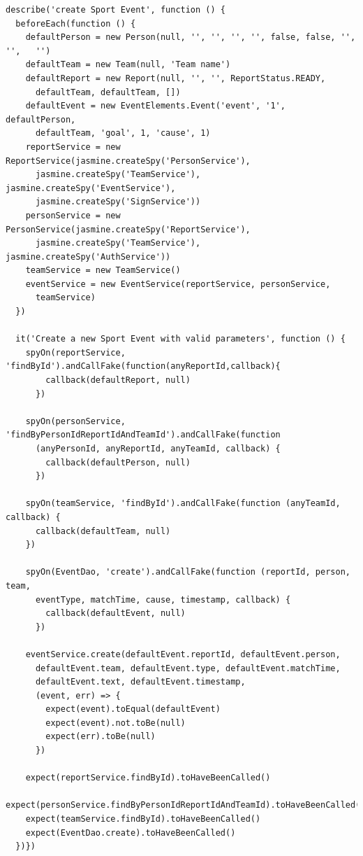     \lstset{}
    \begin{lstlisting}[caption=Exemplo de test no módulo de eventos 
utilizando Jest., label=fig:design:test6]
describe('create Sport Event', function () {
  beforeEach(function () {
    defaultPerson = new Person(null, '', '', '', '', false, false, '', '',   '')
    defaultTeam = new Team(null, 'Team name')
    defaultReport = new Report(null, '', '', ReportStatus.READY, 
      defaultTeam, defaultTeam, [])
    defaultEvent = new EventElements.Event('event', '1', defaultPerson, 
      defaultTeam, 'goal', 1, 'cause', 1)
    reportService = new ReportService(jasmine.createSpy('PersonService'), 
      jasmine.createSpy('TeamService'), jasmine.createSpy('EventService'), 
      jasmine.createSpy('SignService'))
    personService = new PersonService(jasmine.createSpy('ReportService'), 
      jasmine.createSpy('TeamService'), jasmine.createSpy('AuthService'))
    teamService = new TeamService()
    eventService = new EventService(reportService, personService, 
      teamService)
  })

  it('Create a new Sport Event with valid parameters', function () {
    spyOn(reportService, 'findById').andCallFake(function(anyReportId,callback){
        callback(defaultReport, null)
      })

    spyOn(personService, 'findByPersonIdReportIdAndTeamId').andCallFake(function 
      (anyPersonId, anyReportId, anyTeamId, callback) {
        callback(defaultPerson, null)
      })

    spyOn(teamService, 'findById').andCallFake(function (anyTeamId, callback) {
      callback(defaultTeam, null)
    })

    spyOn(EventDao, 'create').andCallFake(function (reportId, person, team, 
      eventType, matchTime, cause, timestamp, callback) {
        callback(defaultEvent, null)
      })

    eventService.create(defaultEvent.reportId, defaultEvent.person, 
      defaultEvent.team, defaultEvent.type, defaultEvent.matchTime, 
      defaultEvent.text, defaultEvent.timestamp,
      (event, err) => {
        expect(event).toEqual(defaultEvent)
        expect(event).not.toBe(null)
        expect(err).toBe(null)
      })

    expect(reportService.findById).toHaveBeenCalled()
    expect(personService.findByPersonIdReportIdAndTeamId).toHaveBeenCalled()
    expect(teamService.findById).toHaveBeenCalled()
    expect(EventDao.create).toHaveBeenCalled()
  })})

  \end{lstlisting}

